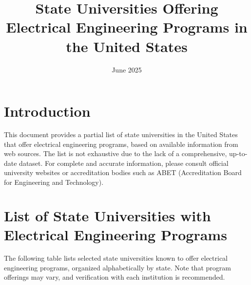 \documentclass[12pt]{article}
\title{State Universities Offering Electrical Engineering Programs in the United States}
\author{}
\date{June 2025}
\begin{document}
\maketitle

\section*{Introduction}
This document provides a partial list of state universities in the United States that offer electrical engineering programs, based on available information from web sources. The list is not exhaustive due to the lack of a comprehensive, up-to-date dataset. For complete and accurate information, please consult official university websites or accreditation bodies such as ABET (Accreditation Board for Engineering and Technology).

\section*{List of State Universities with Electrical Engineering Programs}
The following table lists selected state universities known to offer electrical engineering programs, organized alphabetically by state. Note that program offerings may vary, and verification with each institution is recommended.
\end{document}
